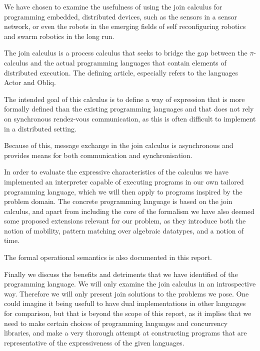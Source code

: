 
We have chosen to examine the usefulness of using the join calculus for
programming embedded, distributed devices, such as the sensors in a sensor
network, or even the robots in the emerging fields of self reconfiguring
robotics and swarm robotics in the long run.

The join calculus is a process calculus that seeks to bridge the gap between the
$\pi$-calculus and the actual programming languages that contain elements of
distributed execution. The defining article, \cite{fournet1996reflexive}
especially refers to the languages Actor and Obliq.

The intended goal of this calculus is to define a way of expression that is more
formally defined than the existing programming languages and that does not rely
on synchronous rendez-vous communication, as this is often difficult to
implement in a distributed setting.

Because of this, message exchange in the join calculus is asynchronous and
provides means for both communication and synchronisation.

In order to evaluate the expressive characteristics of the calculus we have
implemented an interpreter capable of executing programs in our own tailored
programming language, which we will then apply to programs inspired by the
problem domain.  The concrete programming language is based on the join
calculus, and apart from including the core of the formalism we have also deemed
some proposed extensions relevant for our problem, as they introduce both the
notion of mobility, pattern matching over algebraic datatypes, and a notion of
time.

The formal operational semantics  is also documented in this report.

Finally we discuss  the benefits and detriments that we have identified of the
programming language. We will only examine the join calculus in an introspective
way. Therefore we will only present join solutions to the problems we pose. One
could imagine it being usefull to have dual implementations in other languages
for comparison, but that is beyond the scope of this report, as it implies that
we need to make certain choices of programming languages and concurrency
libraries, and make a very thorough attempt at constructing programs that are
representative of the expressiveness of the given languages.
